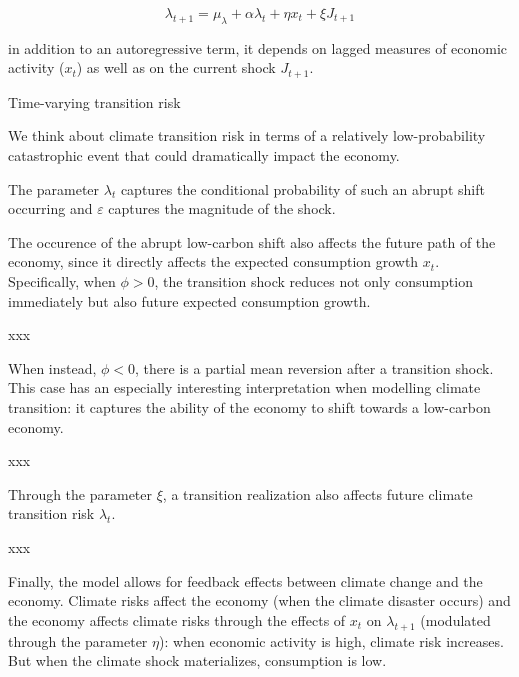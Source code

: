 \begin{equation}
    \lambda_{t+1} = \mu_{\lambda} + \alpha \lambda_t 
    + \eta x_t + \xi J_{t+1}
\end{equation}


in addition to an autoregressive term, 
it depends on lagged measures of economic activity ($x_t$)
as well as on the current shock $J_{t+1}$.


\begin{tcolorbox}[colback=white, colframe=black, title=Example X]
    Time-varying transition risk
\end{tcolorbox}

We think about climate transition risk in terms 
of a relatively low-probability catastrophic event 
that could dramatically impact the economy. 

The parameter $\lambda_t$ captures the conditional
probability of such an abrupt shift occurring and 
$\varepsilon$ captures the magnitude of the shock.

The occurence of the abrupt low-carbon shift also affects the 
future path of the economy, since it directly affects 
the expected consumption growth $x_t$. 
Specifically, when $\phi > 0$, the transition shock
reduces not only consumption immediately 
but also future expected consumption growth. 

\begin{tcolorbox}[colback=white, colframe=black, title=Example X]
    xxx
\end{tcolorbox}

When instead, $\phi < 0$, there is a partial mean reversion
after a transition shock. This case has an especially 
interesting interpretation when modelling climate transition:
it captures the ability of the economy to shift towards 
a low-carbon economy.

\begin{tcolorbox}[colback=white, colframe=black, title=Example X]
    xxx
\end{tcolorbox}

Through the parameter $\xi$, a transition 
realization also affects future climate transition 
risk $\lambda_{t}$.

\begin{tcolorbox}[colback=white, colframe=black, title=Example X]
    xxx
\end{tcolorbox}

Finally, the model allows for feedback effects between 
climate change and the economy. Climate risks affect 
the economy (when the climate disaster occurs) and 
the economy affects climate risks through the effects 
of $x_t$ on $\lambda_{t+1}$ (modulated through the parameter 
$\eta$): when economic activity is high, climate risk 
increases. But when the climate shock materializes, 
consumption is low. 

